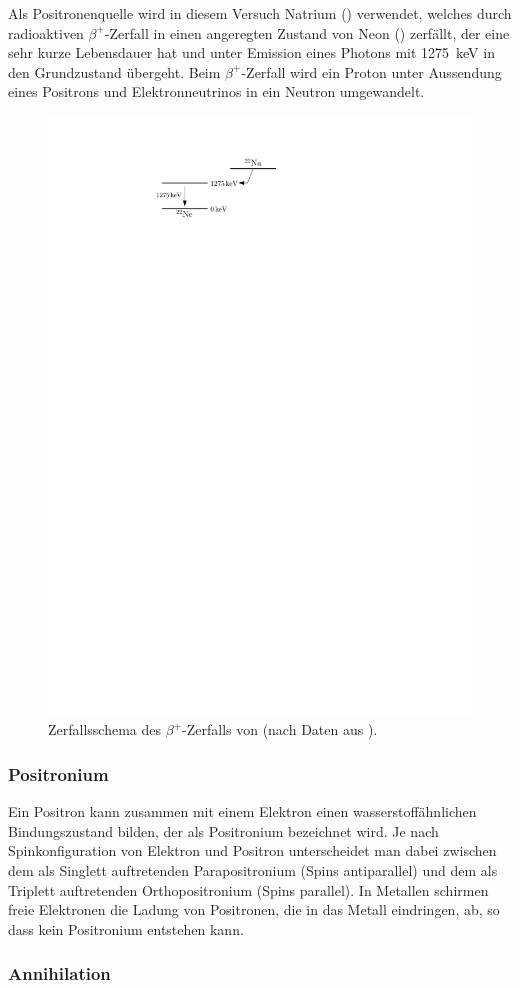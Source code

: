 \documentclass[11pt, a4paper]{article}
\numberwithin{equation}{section}
\begin{document}
Als Positronenquelle wird in diesem Versuch Natrium () verwendet, welches durch radioaktiven $\beta^+$-Zerfall in einen angeregten Zustand von Neon () zerfällt, der eine sehr kurze Lebensdauer hat und unter Emission eines Photons mit \SI{1275}{keV} in den Grundzustand übergeht.
Beim $\beta^+$-Zerfall wird ein Proton unter Aussendung eines Positrons und Elektronneutrinos in ein Neutron umgewandelt.
\begin{figure}[htbp]
	\centering
	\includegraphics[width=.45\textwidth]{./figures/na_decay_scheme}
	\caption{Zerfallsschema des $\beta^+$-Zerfalls von  (nach Daten aus \cite{nuc_datasheet_na}).}
	\label{fig:na_decay_scheme}
\end{figure}

\subsubsection{Positronium}

Ein Positron kann zusammen mit einem Elektron einen wasserstoffähnlichen Bindungszustand bilden, der als Positronium bezeichnet wird.
Je nach Spinkonfiguration von Elektron und Positron unterscheidet man dabei zwischen dem als Singlett auftretenden Parapositronium (Spins antiparallel) und dem als Triplett auftretenden Orthopositronium (Spins parallel).
In Metallen schirmen freie Elektronen die Ladung von Positronen, die in das Metall eindringen, ab, so dass kein Positronium entstehen kann.

\subsubsection{Annihilation}
\end{document}
